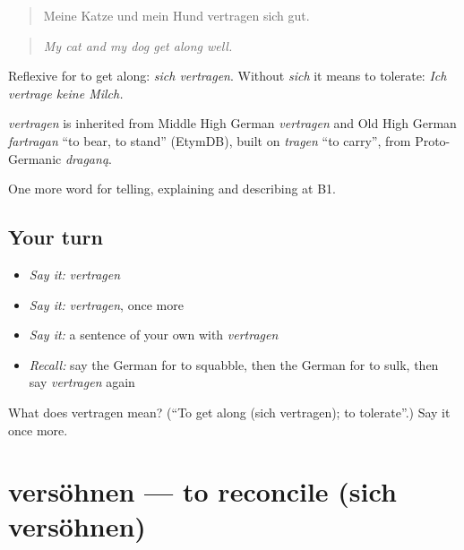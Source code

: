 \begin{quote}
Meine Katze und mein Hund vertragen sich gut.
\end{quote}

\begin{quote}
\emph{My cat and my dog get along well.}
\end{quote}

Reflexive for to get along: \emph{sich vertragen}. Without \emph{sich} it means to tolerate: \emph{Ich vertrage keine Milch.}

\begin{cousinweb}
\emph{vertragen} is inherited from Middle High German \emph{vertragen} and Old High German \emph{fartragan} \textquotedblleft{}to bear, to stand\textquotedblright{} (EtymDB), built on \emph{tragen} \textquotedblleft{}to carry\textquotedblright{}, from Proto-Germanic \emph{draganą}.
\end{cousinweb}

\begin{grammarlens}[title={What you've built}]
One more word for telling, explaining and describing at B1.
\end{grammarlens}

\subsection*{Your turn}
\begin{itemize}
\raggedright
  \item \emph{Say it:} \emph{vertragen}
  \item \emph{Say it:} \emph{vertragen}, once more
  \item \emph{Say it:} a sentence of your own with \emph{vertragen}
  \item \emph{Recall:} say the German for to squabble, then the German for to sulk, then say \emph{vertragen} again
\end{itemize}

\begin{tcolorbox}[breakable,colback=teal!4,colframe=teal!35!black,title={Before you move on}]
What does vertragen mean? (\textquotedblleft{}To get along (sich vertragen); to tolerate\textquotedblright{}.) Say it once more.
\end{tcolorbox}
\section[versöhnen]{versöhnen — to reconcile (sich versöhnen)}

\label{lesson:GE-C494-versoehnen}



